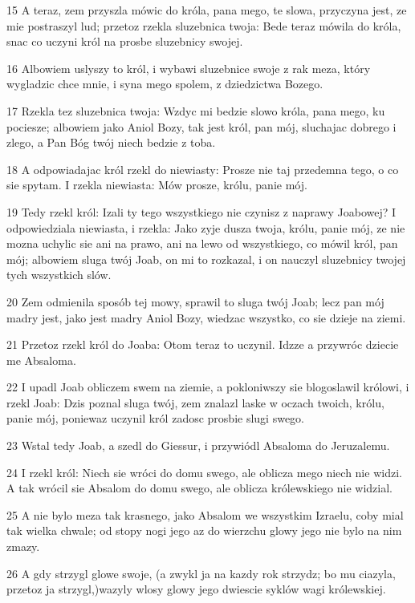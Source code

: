 \par 15 A teraz, zem przyszla mówic do króla, pana mego, te slowa, przyczyna jest, ze mie postraszyl lud; przetoz rzekla sluzebnica twoja: Bede teraz mówila do króla, snac co uczyni król na prosbe sluzebnicy swojej.
\par 16 Albowiem uslyszy to król, i wybawi sluzebnice swoje z rak meza, który wygladzic chce mnie, i syna mego spolem, z dziedzictwa Bozego.
\par 17 Rzekla tez sluzebnica twoja: Wzdyc mi bedzie slowo króla, pana mego, ku pociesze; albowiem jako Aniol Bozy, tak jest król, pan mój, sluchajac dobrego i zlego, a Pan Bóg twój niech bedzie z toba.
\par 18 A odpowiadajac król rzekl do niewiasty: Prosze nie taj przedemna tego, o co sie spytam. I rzekla niewiasta: Mów prosze, królu, panie mój.
\par 19 Tedy rzekl król: Izali ty tego wszystkiego nie czynisz z naprawy Joabowej? I odpowiedziala niewiasta, i rzekla: Jako zyje dusza twoja, królu, panie mój, ze nie mozna uchylic sie ani na prawo, ani na lewo od wszystkiego, co mówil król, pan mój; albowiem sluga twój Joab, on mi to rozkazal, i on nauczyl sluzebnicy twojej tych wszystkich slów.
\par 20 Zem odmienila sposób tej mowy, sprawil to sluga twój Joab; lecz pan mój madry jest, jako jest madry Aniol Bozy, wiedzac wszystko, co sie dzieje na ziemi.
\par 21 Przetoz rzekl król do Joaba: Otom teraz to uczynil. Idzze a przywróc dziecie me Absaloma.
\par 22 I upadl Joab obliczem swem na ziemie, a pokloniwszy sie blogoslawil królowi, i rzekl Joab: Dzis poznal sluga twój, zem znalazl laske w oczach twoich, królu, panie mój, poniewaz uczynil król zadosc prosbie slugi swego.
\par 23 Wstal tedy Joab, a szedl do Giessur, i przywiódl Absaloma do Jeruzalemu.
\par 24 I rzekl król: Niech sie wróci do domu swego, ale oblicza mego niech nie widzi. A tak wrócil sie Absalom do domu swego, ale oblicza królewskiego nie widzial.
\par 25 A nie bylo meza tak krasnego, jako Absalom we wszystkim Izraelu, coby mial tak wielka chwale; od stopy nogi jego az do wierzchu glowy jego nie bylo na nim zmazy.
\par 26 A gdy strzygl glowe swoje, (a zwykl ja na kazdy rok strzydz; bo mu ciazyla, przetoz ja strzygl,)wazyly wlosy glowy jego dwiescie syklów wagi królewskiej.
